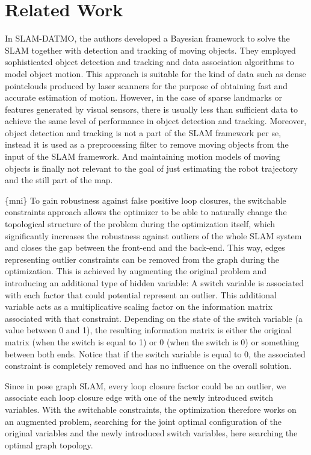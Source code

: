 \section{Related Work}

In SLAM-DATMO, the authors developed a Bayesian framework to solve the SLAM
together with detection and tracking of moving objects. They employed
sophisticated object detection and tracking and data association algorithms to
model object motion. This approach is suitable for the kind of data such as
dense pointclouds produced by laser scanners for the purpose of obtaining fast
and accurate estimation of motion. However, in the case of sparse landmarks or
features generated by visual sensors, there is usually less than sufficient
data to achieve the same level of performance in object detection and
tracking.  Moreover, object detection and tracking is not a part of the SLAM
framework per se, instead it is used as a preprocessing filter to remove
moving objects from the input of the SLAM framework. And maintaining motion
models of moving objects is finally not relevant to the goal of just
estimating the robot trajectory and the still part of the map.


\{mni\} To gain robustness against false positive loop closures, the
switchable constraints approach allows the optimizer to be able to naturally
change the topological structure of the problem during the optimization
itself, which significantly increases the robustness against outliers of the
whole SLAM system and closes the gap between the front-end and the back-end.
This way, edges representing outlier constraints can be removed from the graph
during the optimization. This is achieved by augmenting the original problem
and introducing an additional type of hidden variable: A switch variable is
associated with each factor that could potential represent an outlier. This
additional variable acts as a multiplicative scaling factor on the information
matrix associated with that constraint. Depending on the state of the switch
variable (a value between 0 and 1), the resulting information matrix is either
the original matrix (when the switch is equal to 1) or 0 (when the switch is
0) or something between both ends. Notice that if the switch variable is equal
to 0, the associated constraint is completely removed and has no influence on
the overall solution. 

Since in pose graph SLAM, every loop closure factor could be an outlier, we
associate each loop closure edge with one of the newly introduced switch
variables. With the switchable constraints, the optimization therefore works
on an augmented problem, searching for the joint optimal configuration of the
original variables and the newly introduced switch variables, here searching
the optimal graph topology. 
